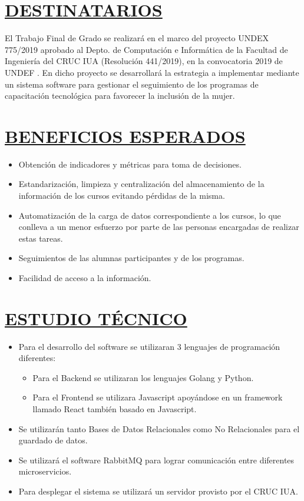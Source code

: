 \section*{\underline{DESTINATARIOS}}
El Trabajo Final de Grado se realizará en el marco del proyecto UNDEX 775/2019 aprobado al Depto. de Computación e Informática de la Facultad de Ingeniería del CRUC IUA (Resolución 441/2019), en la convocatoria 2019 de UNDEF \textbf{\cite{ResolucionUndex}}. En dicho proyecto se desarrollará la estrategia a implementar mediante un sistema software para gestionar el seguimiento de los programas de capacitación tecnológica para favorecer la inclusión de la mujer. \\


\section*{\underline{BENEFICIOS ESPERADOS}}
\begin{itemize}
	\item Obtención de indicadores y métricas para toma de decisiones.
	\item Estandarización, limpieza y centralización del almacenamiento de la información de los cursos evitando pérdidas de la misma.
	\item Automatización de la carga de datos correspondiente a los cursos, lo que conlleva a un menor esfuerzo por parte de las personas encargadas de realizar estas tareas.
	\item Seguimientos de las alumnas participantes y de los programas.
	\item Facilidad de acceso a la información.\\
\end{itemize}


\section*{\underline{ESTUDIO TÉCNICO}}
\begin{itemize}
	\item Para el desarrollo del software se utilizaran 3 lenguajes de programación diferentes:
	\begin{itemize}
		\item Para el Backend se utilizaran los lenguajes Golang y Python.
		\item Para el Frontend se utilizara Javascript apoyándose en un framework llamado React también basado en Javascript.
	\end{itemize}
	\item Se utilizarán tanto Bases de Datos Relacionales como No Relacionales para el guardado de datos.
	\item Se utilizará el software RabbitMQ para lograr comunicación entre diferentes microservicios.
	\item Para desplegar el sistema se utilizará un servidor provisto por el CRUC IUA.\\
\end{itemize}




